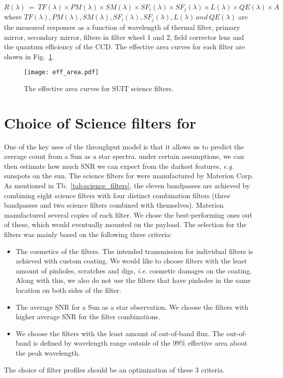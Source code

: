 \begin{equation}
    R(\lambda)~=~TF(\lambda)\times PM(\lambda)\times SM(\lambda)\times SF_{i}(\lambda)\times SF_{j}(\lambda)\times L(\lambda)\times QE(\lambda)\times A
    \label{eq:eff_area}
\end{equation}
where $TF(\lambda), PM(\lambda), SM(\lambda), SF_{i}(\lambda), SF_{j}(\lambda), L(\lambda)~and~QE(\lambda)$ are the measured responses as a function of wavelength of thermal filter, primary mirror, secondary mirror, filters in filter wheel 1 and 2, field corrector lens and the quantum efficiency of the CCD. The effective area curves for each filter are shown in Fig.~\ref{fig:eff_area}.

\begin{figure}[ht!]
    \centering
    \texttt{[image: eff\_area.pdf]}
    \caption{The effective area curves for SUIT science filters.}
    \label{fig:eff_area}
\end{figure}

\section{Choice of Science filters for {\suit}}\label{sec:sc_filt_choice}

One of the key uses of the throughput model is that it allows us to predict the average count from a Sun as a star spectra. under certain assumptions, we can then estimate how much SNR we can expect from the darkest features, {\it e.g.} sunspots on the sun. The science filters for {\suit} were manufactured by Materion Corp. As mentioned in Tb.~\ref{tab:science_filters}, the eleven bandpasses are achieved by combining eight science filters with four distinct combination filters (three bandpasses and two science filters combined with themselves). Materion manufactured several copies of each filter. We chose the best-performing ones out of these, which would eventually mounted on the payload. The selection for the filters was mainly based on the following three criteria:

\begin{itemize}
    \item The cosmetics of the filters. The intended transmission for individual filters is achieved with custom coating. We would like to choose filters with the least amount of pinholes, scratches and digs, {\it i.e.} cosmetic damages on the coating. Along with this, we also do not use the filters that have pinholes in the same location on both sides of the filter.
    \item The average SNR for a Sun as a star observation. We choose the filters with higher average SNR for the filter combinations.
    \item We choose the filters with the least amount of out-of-band flux. The out-of-band is defined by wavelength range outside of the 99\% effective area about the peak wavelength. 
\end{itemize}
The choice of filter profiles should be an optimization of these 3 criteria.

